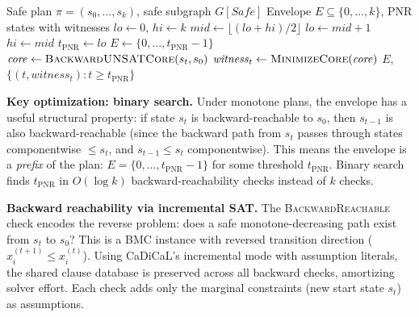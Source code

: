 \documentclass[10pt,twocolumn]{article}
\begin{document}
\begin{algorithm}[t]
\caption{\textsc{ComputeEnvelope}: Rollback safety envelope with binary search}
\label{alg:envelope}
\begin{algorithmic}[1]
\Require Safe plan $\pi = (s_0, \ldots, s_k)$, safe subgraph $G[\mathit{Safe}]$
\Ensure Envelope $E \subseteq \{0, \ldots, k\}$, PNR states with witnesses
\State {}
\State $\mathit{lo} \gets 0$, $\mathit{hi} \gets k$
  \State $\mathit{mid} \gets \lfloor (\mathit{lo} + \mathit{hi}) / 2 \rfloor$
    \State $\mathit{lo} \gets \mathit{mid} + 1$ 
  \Else
    \State $\mathit{hi} \gets \mathit{mid}$ 
  \EndIf
\EndWhile
\State $t_{\mathrm{PNR}} \gets \mathit{lo}$ 
\State $E \gets \{0, \ldots, t_{\mathrm{PNR}} - 1\}$
\State {}
  \State $\mathit{core} \gets \textsc{BackwardUNSATCore}(s_t, s_0)$
  \State $\mathit{witness}_t \gets \textsc{MinimizeCore}(\mathit{core})$
\EndFor
\State \Return $E$, $\{(t, \mathit{witness}_t) : t \geq t_{\mathrm{PNR}}\}$
\end{algorithmic}
\end{algorithm}

\textbf{Key optimization: binary search.} Under monotone plans, the envelope has a useful structural property: if state $s_t$ is backward-reachable to $s_0$, then $s_{t-1}$ is also backward-reachable (since the backward path from $s_t$ passes through states componentwise $\leq s_t$, and $s_{t-1} \leq s_t$ componentwise). This means the envelope is a \emph{prefix} of the plan: $E = \{0, \ldots, t_{\mathrm{PNR}}-1\}$ for some threshold $t_{\mathrm{PNR}}$. Binary search finds $t_{\mathrm{PNR}}$ in $O(\log k)$ backward-reachability checks instead of $k$ checks.

\textbf{Backward reachability via incremental SAT.} The \textsc{BackwardReachable} check encodes the reverse problem: does a safe monotone-decreasing path exist from $s_t$ to $s_0$? This is a BMC instance with reversed transition direction ($x_i^{(t+1)} \leq x_i^{(t)}$). Using CaDiCaL's incremental mode with assumption literals, the shared clause database is preserved across all backward checks, amortizing solver effort. Each check adds only the marginal constraints (new start state $s_t$) as assumptions.
\end{document}
